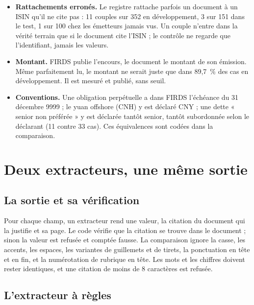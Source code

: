 \documentclass[11pt,a4paper]{article}
\begin{document}
\begin{itemize}
  \item \textbf{Rattachements erronés.} Le registre rattache parfois un document à un ISIN qu'il ne cite pas : 11 couples sur 352 en développement, 3 sur 151 dans le test, 1 sur 100 chez les émetteurs jamais vus. Un couple n'entre dans la vérité terrain que si le document cite l'ISIN ; le contrôle ne regarde que l'identifiant, jamais les valeurs.
  \item \textbf{Montant.} FIRDS publie l'encours, le document le montant de son émission. Même parfaitement lu, le montant ne serait juste que dans 89,7~\% des cas en développement. Il est mesuré et publié, sans seuil.
  \item \textbf{Conventions.} Une obligation perpétuelle a dans FIRDS l'échéance du 31 décembre 9999 ; le yuan offshore (CNH) y est déclaré CNY ; une dette « senior non préférée » y est déclarée tantôt senior, tantôt subordonnée selon le déclarant (11 contre 33 cas). Ces équivalences sont codées dans la comparaison.
\end{itemize}


\section{Deux extracteurs, une même sortie}

\subsection{La sortie et sa vérification}

Pour chaque champ, un extracteur rend une valeur, la citation du document qui la justifie et sa page. Le code vérifie que la citation se trouve dans le document ; sinon la valeur est refusée et comptée fausse. La comparaison ignore la casse, les accents, les espaces, les variantes de guillemets et de tirets, la ponctuation en tête et en fin, et la numérotation de rubrique en tête. Les mots et les chiffres doivent rester identiques, et une citation de moins de 8 caractères est refusée.

\subsection{L'extracteur à règles}
\end{document}
